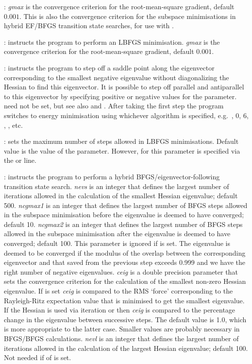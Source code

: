 {{: 
{\it gmax\/} is the convergence criterion
for the root-mean-square gradient, default $0.001$.
This is also the convergence criterion
for the subspace minimisations in hybrid EF/BFGS transition state searches, for use with {}.

: instructs the program to perform an LBFGS minimisation. 
{\it gmax\/} is the convergence criterion
for the root-mean-square gradient, default $0.001$. 

: instructs the program to step off a saddle point along the
eigenvector corresponding to the smallest negative eigenvalue without
diagonalizing the Hessian to find this eigenvector. It is possible to step off
parallel and antiparallel to this eigenvector by specifying positive or negative values
for the {} parameter. {} need not be set, but see also
 and . After taking the first step the program switches to
energy minimisation using whichever algorithm is specified, e.g.~{},
{ 0}, { 6}, {}, {}, etc.

: sets the maximum number of steps allowed in LBFGS minimisations.
Default value is the value of the {} parameter.
However, for  this parameter is specified via the  or
 line.

: instructs the program to perform a
hybrid BFGS/eigenvector-following transition state search.
{\it nevs\/} is an integer that defines the largest number of iterations allowed in the
calculation of the smallest Hessian eigenvalue; default 500.
{\it ncgmax1\/} is an integer that defines the largest number of BFGS steps
allowed in the subspace minimisation before the eigenvalue is deemed to have converged; default 10.
{\it ncgmax2\/} is an integer that defines the largest number of BFGS steps
allowed in the subspace minimisation after the eigenvalue is deemed to have converged; default 100.
This parameter is ignored if {} is set.
The eigenvalue is deemed to be converged if the modulus of the overlap between the corresponding
eigenvector and that saved from the previous step exceeds 0.999 and we have the right number of
negative eigenvalues.
{\it ceig\/} is a double precision parameter that sets the convergence criterion for
the calculation of the smallest non-zero Hessian eigenvalue.
If {} is set {\it ceig\/} is compared to the RMS `force' corresponding to the
Rayleigh-Ritz expectation value that is minimised to get the smallest eigenvalue.
If the Hessian is used via iteration or {}
then {\it ceig\/} is compared to the percentage change in the eigenvalue between successive
steps. The default value is 1.0, which is more appropriate to the latter case. Smaller
values are probably necessary in BFGS/BFGS calculations.
{\it nevl\/} is an integer that defines the largest number of iterations allowed in the
calculation of the largest Hessian eigenvalue; default 100. Not needed if {}
of {} is set. 

}}
